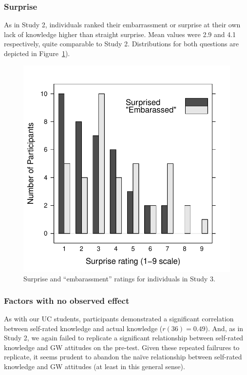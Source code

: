 \subsubsection{Surprise}

As in Study 2, individuals ranked their embarrassment or surprise at their own
lack of knowledge higher than straight surprise. Mean values were 2.9 and 4.1
respectively, quite comparable to Study 2. Distributions for both questions are
depicted in Figure~\ref{fig:CCO-mech-surprise}). 

\begin{figure}
    \centering
    \includegraphics{CCO-mech-surprise-by-question.pdf}
    \caption{Surprise and “embarassment” ratings for individuals in Study 3.}
    \label{fig:CCO-mech-surprise}
\end{figure}

\subsubsection{Factors with no observed effect}

As with our UC students, participants demonstrated a significant correlation
between self-rated knowledge and actual knowledge ($r(36)=0.49$).  And, as in
Study 2, we again failed to replicate a significant relationship between
self-rated knowledge and GW attitudes on the pre-test. Given these repeated
failrures to replicate, it seems prudent to abandon the naïve relationship
between self-rated knowledge and GW attitudes (at least in this general sense).

